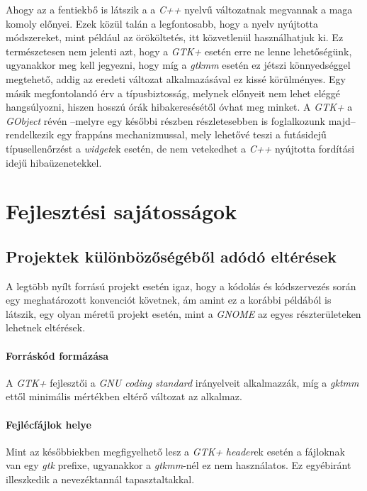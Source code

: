 Ahogy az a fentiekbő is látszik a a \textit{C++} nyelvű változatnak megvannak a maga komoly előnyei. Ezek közül talán a legfontosabb, hogy a nyelv nyújtotta módszereket, mint például az örököltetés, itt közvetlenül használhatjuk ki. Ez természetesen nem jelenti azt, hogy a \textit{GTK+} esetén erre ne lenne lehetőségünk, ugyanakkor meg kell jegyezni, hogy míg a \textit{gtkmm} esetén ez jétszi könnyedséggel megtehető, addig az eredeti változat alkalmazásával ez kissé körülményes. Egy másik megfontolandó érv a típusbiztosság, melynek előnyeit nem lehet eléggé hangsúlyozni, hiszen hosszú órák hibakeresésétől óvhat meg minket. A \textit{GTK+} a \textit{GObject} révén --melyre egy későbbi részben részletesebben is foglalkozunk majd-- rendelkezik egy frappáns mechanizmussal, mely lehetővé teszi a futásidejű típusellenőrzést a \textit{widget}ek esetén, de nem vetekedhet a \textit{C++} nyújtotta fordítási idejű hibaüzenetekkel.

\section{Fejlesztési sajátosságok}

\subsection{Projektek különbözőségéből adódó eltérések}

A legtöbb nyílt forrású projekt esetén igaz, hogy a kódolás és kódszervezés során egy meghatározott konvenciót követnek, ám amint ez a korábbi példából is látszik, egy olyan méretű projekt esetén, mint a \textit{GNOME} az egyes részterületeken lehetnek eltérések.

\paragraph{Forráskód formázása}

A \textit{GTK+} fejlesztői a \textit{GNU coding standard} irányelveit alkalmazzák, míg a \textit{gktmm} ettől minimális mértékben eltérő változat az alkalmaz.

\paragraph{Fejlécfájlok helye}

Mint az későbbiekben megfigyelhető lesz a \textit{GTK+} \textit{header}ek esetén a fájloknak van egy \textit{gtk} prefixe, ugyanakkor a \textit{gtkmm}-nél ez nem használatos. Ez egyébiránt illeszkedik a nevezéktannál tapasztaltakkal.

